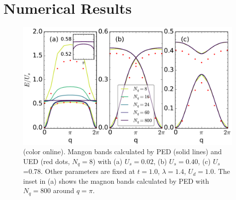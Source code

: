 \documentclass[amsmath,superscriptaddress,showpacs,aps,prb,twocolumn]{revtex4-1}
\begin{document}
\section{Numerical Results}\label{nr}
\begin{figure}
\includegraphics[scale=0.41]{spectrum}
\caption{(color online). Mangon bands calculated by PED (solid lines) and UED (red dots, $N_q=8$) with (a) $U_s=0.02$, (b) $U_s=0.40$, (c) $U_s$=0.78. Other parameters are fixed at $t=1.0$, $\lambda=1.4$, $U_d=1.0$. The inset in (a) shows the magnon bands calculated by PED with $N_q=800$ around $q=\pi$.}
\label{spectrum}
\end{figure}
\end{document}
